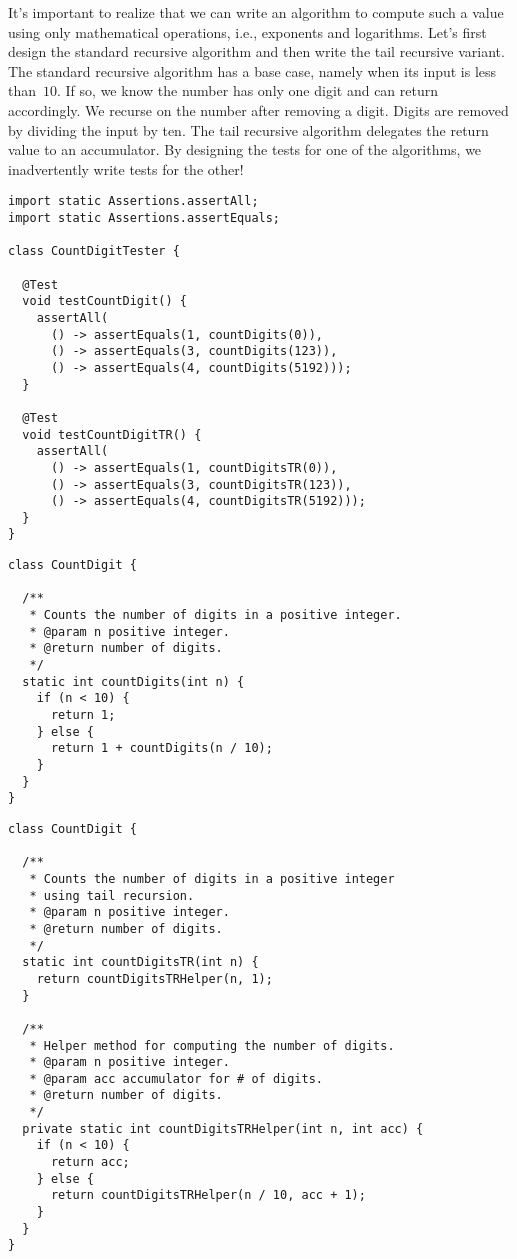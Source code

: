 It's important to realize that we can write an algorithm to compute such a value using only mathematical operations, i.e., exponents and logarithms.
Let's first design the standard recursive algorithm and then write the tail recursive variant.
The standard recursive algorithm has a base case, namely when its input is less than~$10$. If so, we know the number has only one digit and can return accordingly.
We recurse on the number after removing a digit.
Digits are removed by dividing the input by ten.
The tail recursive algorithm delegates the return value to an accumulator.
By designing the tests for one of the algorithms, we inadvertently write tests for the other!

\enlargethispage{-2\baselineskip}
\begin{lstlisting}[language=MyJava]
import static Assertions.assertAll;
import static Assertions.assertEquals;

class CountDigitTester {

  @Test
  void testCountDigit() {
    assertAll(
      () -> assertEquals(1, countDigits(0)),
      () -> assertEquals(3, countDigits(123)),
      () -> assertEquals(4, countDigits(5192)));
  }

  @Test
  void testCountDigitTR() {
    assertAll(
      () -> assertEquals(1, countDigitsTR(0)),
      () -> assertEquals(3, countDigitsTR(123)),
      () -> assertEquals(4, countDigitsTR(5192)));
  }
}
\end{lstlisting}

\begin{lstlisting}[language=MyJava]
class CountDigit {

  /**
   * Counts the number of digits in a positive integer.
   * @param n positive integer.
   * @return number of digits.
   */
  static int countDigits(int n) {
    if (n < 10) {
      return 1;
    } else {
      return 1 + countDigits(n / 10);
    }
  }
}
\end{lstlisting}

\begin{lstlisting}[language=MyJava]
class CountDigit {

  /**
   * Counts the number of digits in a positive integer
   * using tail recursion.
   * @param n positive integer.
   * @return number of digits.
   */
  static int countDigitsTR(int n) {
    return countDigitsTRHelper(n, 1);
  }

  /**
   * Helper method for computing the number of digits.
   * @param n positive integer.
   * @param acc accumulator for # of digits.
   * @return number of digits.
   */
  private static int countDigitsTRHelper(int n, int acc) {
    if (n < 10) {
      return acc;
    } else {
      return countDigitsTRHelper(n / 10, acc + 1);
    }
  }
}
\end{lstlisting}

